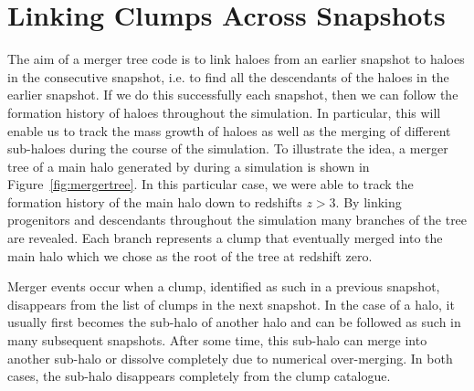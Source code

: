 \section{Linking Clumps Across Snapshots}

The aim of a merger tree code is to link haloes from an earlier
snapshot to haloes in the consecutive snapshot, i.e. to find all the
descendants of the haloes in the earlier snapshot. If we do this
successfully each snapshot, then we can follow the formation history of
haloes throughout the simulation. In particular, this will enable us
to track the mass growth of haloes as well as the merging of different
sub-haloes during the course of the simulation.
To illustrate the idea, a merger tree of a main halo generated by
\acacia during a simulation is shown in Figure~\ref{fig:mergertree}.
In this particular case, we were able to track the formation history of the
main halo down to redshifts $z > 3$. By linking progenitors and descendants
throughout the simulation many branches of the tree are revealed.
Each branch represents a clump that eventually merged into the main halo
which we chose as the root of the tree at redshift zero.

Merger events occur when a clump, identified as such in a previous
snapshot, disappears from the list of clumps in the next snapshot. In
the case of a halo, it usually first becomes the sub-halo of another
halo and can be followed as such in many subsequent snapshots. After
some time, this sub-halo can merge into another sub-halo or dissolve
completely due to numerical over-merging. In both cases, the sub-halo
disappears completely from the clump catalogue.

